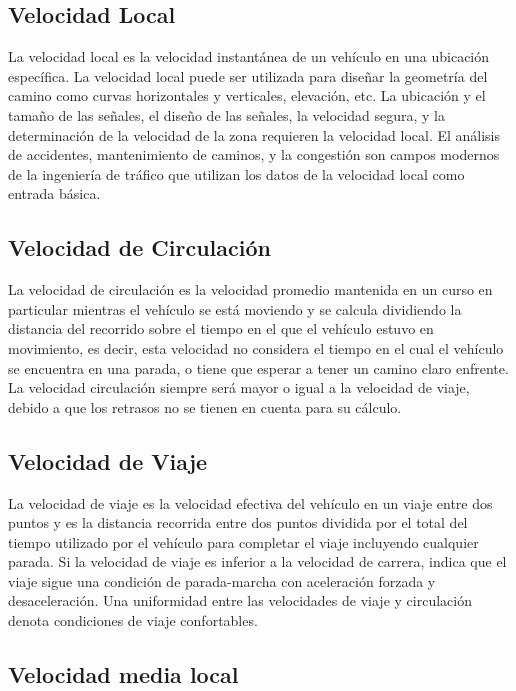 \documentclass[final,fmstyle]{fpunathesis}
\begin{document}
\subsection{Velocidad Local}

La velocidad local es la velocidad instantánea de un vehículo en una ubicación específica. La velocidad local puede ser utilizada para diseñar la geometría del camino como curvas horizontales y verticales, elevación, etc. La ubicación y el tamaño de las señales, el diseño de las señales, la velocidad segura, y la determinación de la velocidad de la zona requieren la velocidad local. El análisis de accidentes, mantenimiento de caminos, y la congestión son campos modernos de la ingeniería de tráfico que utilizan los datos de la velocidad local como entrada básica. 

\subsection{Velocidad de Circulación}

La velocidad de circulación es la velocidad promedio mantenida en un curso en particular mientras el vehículo se está moviendo y se calcula dividiendo la distancia del recorrido sobre el tiempo en el que el vehículo estuvo en movimiento, es decir, esta velocidad no considera el tiempo en el cual el vehículo se encuentra en una parada, o tiene que esperar a tener un camino claro enfrente. La velocidad circulación siempre será mayor o igual a la velocidad de viaje, debido a que los retrasos no se tienen en cuenta para su cálculo.

\subsection{Velocidad de Viaje}

La velocidad de viaje es la velocidad efectiva del vehículo en un viaje entre dos puntos y es la distancia recorrida entre dos puntos dividida por el total del tiempo utilizado por el vehículo para completar el viaje incluyendo cualquier parada. Si la velocidad de viaje es inferior a la velocidad de carrera, indica que el viaje sigue una condición de parada-marcha con aceleración forzada y desaceleración. Una uniformidad entre las velocidades de viaje y circulación denota condiciones de viaje confortables.

\subsection{Velocidad media local}
\end{document}
